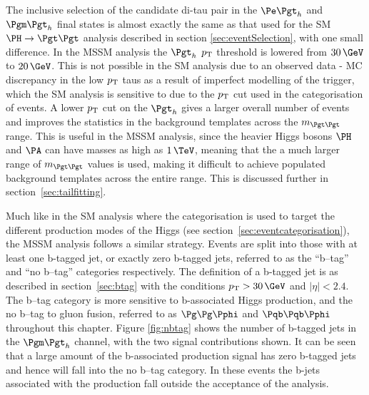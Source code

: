 The inclusive selection of the candidate di-tau pair in the $\etau$ and $\mutau$
final states is almost exactly the same
as that used for the \ac{SM} $\HToTauTau$ analysis described in section
\ref{sec:eventSelection}, with one small difference. In the \ac{MSSM} analysis
the $\Pgth$ $p_{\mathrm{T}}$ threshold is lowered from $30\,\GeV$ to $20\,\GeV$. This is
not possible in the \ac{SM} analysis due to an observed data - \ac{MC}
discrepancy in the low $p_{\mathrm{T}}$ taus as a result of imperfect modelling of the
trigger, which the \ac{SM} analysis is sensitive to due to the $p_{\mathrm{T}}$ cut used in the
categorisation of events. A lower $p_{\mathrm{T}}$ cut on the $\Pgth$ gives a larger overall number of events
and improves the statistics in the background templates across the
$m_{\Pgt\Pgt}$ range. This is useful in the \ac{MSSM} analysis, since the 
heavier Higgs bosons $\PH$ and $\PA$ can have masses as high as $1\,\TeV$,
meaning that the a much larger range of $m_{\Pgt\Pgt}$ values is used, making it
difficult to achieve populated background templates across the entire range.
This is discussed further in section~\ref{sec:tailfitting}.

Much like in the \ac{SM} analysis where the categorisation is used to target the different 
production modes of the Higgs (see section~\ref{sec:eventcategorisation}), 
the \ac{MSSM} analysis follows a similar
strategy. Events are split into those with at least one b-tagged jet, or exactly
zero b-tagged jets, referred to as the ``b--tag'' and ``no b--tag'' categories
respectively. The definition of a b-tagged jet is as described in
section~\ref{sec:btag} with the conditions
$\pt > 30\,\GeV$ and $|\eta| < 2.4$. The b--tag
category is more sensitive to b-associated Higgs production, and the no b--tag
to gluon fusion, referred to as $\Pg\Pg\Pphi$ and $\Pqb\Pqb\Pphi$ throughout
this chapter. Figure \ref{fig:nbtag} shows the number of b-tagged jets in the
$\mutau$ channel, with the two signal contributions shown. It can be seen
that a large amount of the b-associated production signal has zero b-tagged jets
and hence will fall into the no b--tag category. In these events the b-jets
associated with the production fall outside the acceptance of the analysis.

